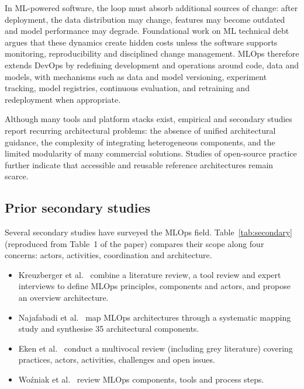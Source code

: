 \documentclass[11pt,a4paper]{article}
\begin{document}
In ML-powered software, the loop must absorb additional sources of change: after deployment, the data distribution may change, features may become outdated and model performance may degrade. Foundational work on ML technical debt~\cite{sculley2015} argues that these dynamics create hidden costs unless the software supports monitoring, reproducibility and disciplined change management. MLOps therefore extends DevOps by redefining development and operations around code, data and models, with mechanisms such as data and model versioning, experiment tracking, model registries, continuous evaluation, and retraining and redeployment when appropriate.

Although many tools and platform stacks exist, empirical and secondary studies report recurring architectural problems: the absence of unified architectural guidance, the complexity of integrating heterogeneous components, and the limited modularity of many commercial solutions. Studies of open-source practice further indicate that accessible and reusable reference architectures remain scarce.

\subsection{Prior secondary studies}

Several secondary studies have surveyed the MLOps field. Table~\ref{tab:secondary} (reproduced from Table~1 of the paper) compares their scope along four concerns: actors, activities, coordination and architecture.
\begin{itemize}
  \item Kreuzberger et al.~\cite{kreuzberger2023} combine a literature review, a tool review and expert interviews to define MLOps principles, components and actors, and propose an overview architecture.
  \item Najafabadi et al.~\cite{najafabadi2024} map MLOps architectures through a systematic mapping study and synthesise 35 architectural components.
  \item Eken et al.~\cite{eken2025} conduct a multivocal review (including grey literature) covering practices, actors, activities, challenges and open issues.
  \item Wo\'zniak et al.~\cite{wozniak2025} review MLOps components, tools and process steps.
\end{itemize}
\end{document}
